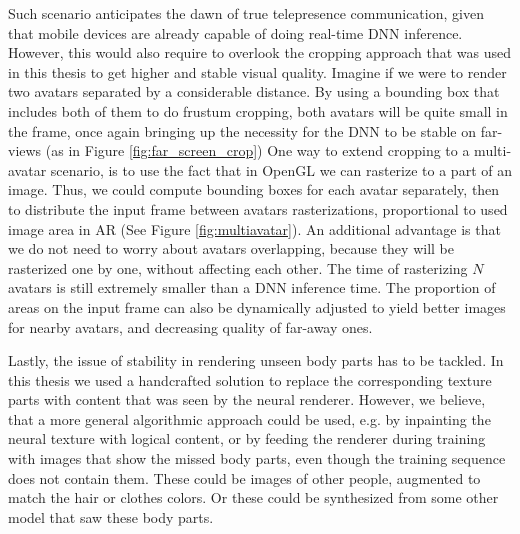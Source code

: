 Such scenario anticipates the dawn of true telepresence communication, given that mobile devices are already capable of doing real-time DNN inference. However, this would also require to overlook the cropping approach that was used in this thesis to get higher and stable visual quality. Imagine if we were to render two avatars separated by a considerable distance. By using a bounding box that includes both of them to do frustum cropping, both avatars will be quite small in the frame, once again bringing up the necessity for the DNN to be stable on far-views (as in Figure \ref{fig:far_screen_crop}) One way to extend cropping to a multi-avatar scenario, is to use the fact that in OpenGL we can rasterize to a part of an image. Thus, we could compute bounding boxes for each avatar separately, then to distribute the input frame between avatars rasterizations, proportional to used image area in AR (See Figure \ref{fig:multiavatar}). An additional advantage is that we do not need to worry about avatars overlapping, because they will be rasterized one by one, without affecting each other. The time of rasterizing $N$ avatars is still extremely smaller than a DNN inference time. The proportion of areas on the input frame can also be dynamically adjusted to yield better images for nearby avatars, and decreasing quality of far-away ones.

Lastly, the issue of stability in rendering unseen body parts has to be tackled. In this thesis we used a handcrafted solution to replace the corresponding texture parts with content that was seen by the neural renderer. However, we believe, that a more general algorithmic approach could be used, e.g. by inpainting the neural texture with logical content, or by feeding the renderer during training with images that show the missed body parts, even though the training sequence does not contain them. These could be images of other people, augmented to match the hair or clothes colors. Or these could be synthesized from some other model that saw these body parts.
